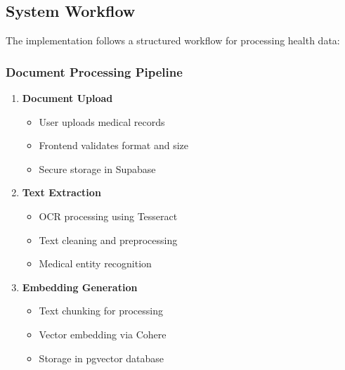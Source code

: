 \subsection{System Workflow}
The implementation follows a structured workflow for processing health data:

\subsubsection{Document Processing Pipeline}
\begin{enumerate}
    \item \textbf{Document Upload}
    \begin{itemize}
        \item User uploads medical records
        \item Frontend validates format and size
        \item Secure storage in Supabase
    \end{itemize}

    \item \textbf{Text Extraction}
    \begin{itemize}
        \item OCR processing using Tesseract
        \item Text cleaning and preprocessing
        \item Medical entity recognition
    \end{itemize}

    \item \textbf{Embedding Generation}
    \begin{itemize}
        \item Text chunking for processing
        \item Vector embedding via Cohere
        \item Storage in pgvector database
    \end{itemize}
\end{enumerate}

